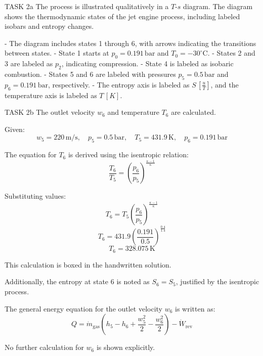 TASK 2a  
The process is illustrated qualitatively in a \( T \)-\( s \) diagram. The diagram shows the thermodynamic states of the jet engine process, including labeled isobars and entropy changes.  

- The diagram includes states 1 through 6, with arrows indicating the transitions between states.  
- State 1 starts at \( p_0 = 0.191 \, \text{bar} \) and \( T_0 = -30^\circ\text{C} \).  
- States 2 and 3 are labeled as \( p_2 \), indicating compression.  
- State 4 is labeled as isobaric combustion.  
- States 5 and 6 are labeled with pressures \( p_5 = 0.5 \, \text{bar} \) and \( p_6 = 0.191 \, \text{bar} \), respectively.  
- The entropy axis is labeled as \( S \, [\frac{u}{T}] \), and the temperature axis is labeled as \( T \, [K] \).  

TASK 2b  
The outlet velocity \( w_6 \) and temperature \( T_6 \) are calculated.  

Given:  
\[
w_5 = 220 \, \text{m/s}, \quad p_5 = 0.5 \, \text{bar}, \quad T_5 = 431.9 \, \text{K}, \quad p_6 = 0.191 \, \text{bar}
\]  

The equation for \( T_6 \) is derived using the isentropic relation:  
\[
\frac{T_6}{T_5} = \left( \frac{p_6}{p_5} \right)^{\frac{\kappa - 1}{\kappa}}
\]  

Substituting values:  
\[
T_6 = T_5 \left( \frac{p_6}{p_5} \right)^{\frac{\kappa - 1}{\kappa}}
\]  
\[
T_6 = 431.9 \left( \frac{0.191}{0.5} \right)^{\frac{0.4}{1.4}}
\]  
\[
T_6 = 328.075 \, \text{K}
\]  

This calculation is boxed in the handwritten solution.  

Additionally, the entropy at state 6 is noted as \( S_6 = S_5 \), justified by the isentropic process.  

The general energy equation for the outlet velocity \( w_6 \) is written as:  
\[
Q = \dot{m}_{\text{gas}} \left( h_5 - h_6 + \frac{w_5^2}{2} - \frac{w_6^2}{2} \right) - \dot{W}_{\text{rev}}
\]  

No further calculation for \( w_6 \) is shown explicitly.